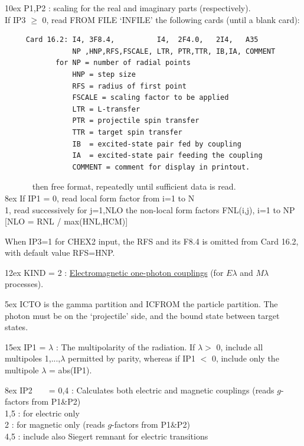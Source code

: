 \documentclass[11pt]{article}
\begin{document}
\hangindent 10ex
 P1,P2 : scaling for the real and imaginary parts (respectively).\\

   If IP3 $\geq$  0, read FROM FILE `INFILE'  the following cards
   (until a blank card):
\begin{verbatim}
     Card 16.2: I4, 3F8.4,          I4,  2F4.0,   2I4,   A35
                NP ,HNP,RFS,FSCALE, LTR, PTR,TTR, IB,IA, COMMENT
            for NP = number of radial points
                HNP = step size
                RFS = radius of first point
                FSCALE = scaling factor to be applied
                LTR = L-transfer
                PTR = projectile spin transfer
                TTR = target spin transfer
                IB  = excited-state pair fed by coupling
                IA  = excited-state pair feeding the coupling
                COMMENT = comment for display in printout.
\end{verbatim}
    ~~~~~~ then free format, repeatedly until sufficient data is read.\\


\hangindent 8ex  If IP1 =
      0, read local form factor from i=1 to N
\\  1, read successively for j=1,NLO the non-local form factors
 FNL(i,j), i=1 to NP   [NLO = RNL / max(HNL,HCM)]


When IP3=1 for CHEX2 input, the RFS and its F8.4 is omitted from Card 16.2,
with default value RFS=HNP.
\bigskip


\hangindent 12ex
KIND = 2 :
\underline{Electromagnetic one-photon couplings} (for $E\lambda$ and
$M\lambda$ processes).


\hangindent 5ex
 ICTO is the gamma partition and ICFROM the particle partition.
 The photon must be on the `projectile' side, and the bound state between
 target states.

\hangindent 15ex
 IP1 = $\lambda$ : The multipolarity of the radiation.
 If $\lambda >$ 0, include all multipoles 1,...,$\lambda$
permitted by parity, whereas if IP1 $<$ 0, include only the multipole
$\lambda$ = abs(IP1).
%

\hangindent 8ex  IP2
~ ~   = 0,4 : Calculates both electric and magnetic couplings
(reads $g$-factors from P1\&P2)
\\    1,5 : for electric only
\\    2 : for magnetic only (reads $g$-factors from P1\&P2)
\\    4,5 : include also Siegert remnant for electric transitions
\end{document}
